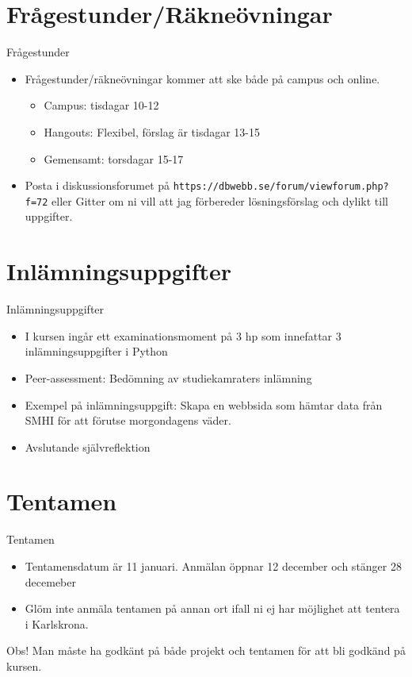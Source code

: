 \documentclass{beamer}
\begin{document}
\section{Frågestunder/Räkneövningar}
\begin{frame}{Frågestunder}
  \begin{itemize}
  \item Frågestunder/räkneövningar kommer att ske både på campus och
    online.
    \begin{itemize}
    \item Campus: tisdagar 10-12
    \item Hangouts: Flexibel, förslag är tisdagar 13-15
    \item Gemensamt: torsdagar 15-17 
    \end{itemize}
  \item Posta i diskussionsforumet på
    \texttt{https://dbwebb.se/forum/viewforum.php?f=72} 
    eller Gitter om ni vill att jag förbereder lösningsförslag och dylikt till uppgifter.
  \end{itemize}
\end{frame}

\section{Inlämningsuppgifter}
\begin{frame}{Inlämningsuppgifter}
  \begin{itemize}
  \item I kursen ingår ett examinationsmoment på 3 hp som innefattar
    3 inlämningsuppgifter i Python
  \item Peer-assessment: Bedömning av studiekamraters inlämning
  \item Exempel på inlämningsuppgift: Skapa en webbsida som hämtar
    data från SMHI för att förutse morgondagens väder.
  \item Avslutande självreflektion
  \end{itemize}
\end{frame}
\section{Tentamen}
\begin{frame}{Tentamen}
  \begin{itemize}
  \item Tentamensdatum är 11 januari. Anmälan öppnar 12 december och stänger 28 decemeber
  \item Glöm inte anmäla tentamen på annan ort ifall ni ej har
    möjlighet att tentera i Karlskrona.
  \end{itemize}
  Obs! Man måste ha godkänt på både projekt och tentamen för att bli godkänd på kursen.
\end{frame}
\end{document}
